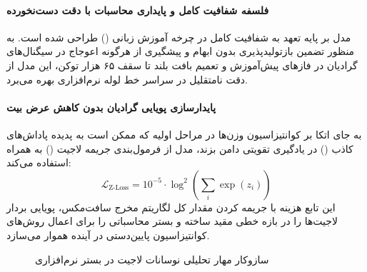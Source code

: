 \item {}

\paragraph*{فلسفه شفافیت کامل و پایداری محاسبات با دقت دست‌نخورده}
مدل  \cite{olmo2025olmo3} بر پایه تعهد به شفافیت کامل در چرخه آموزش زبانی () طراحی شده است. به منظور تضمین بازتولیدپذیری بدون ابهام و پیشگیری از هرگونه اعوجاج در سیگنال‌های گرادیان در فازهای پیش‌آموزش و تعمیم بافت بلند تا سقف ۶۵ هزار توکن، این مدل از دقت نامتقلیل \textbf{} در سراسر خط لوله نرم‌افزاری  بهره می‌برد.

\paragraph*{پایدارسازی پویایی گرادیان بدون کاهش عرض بیت}
به جای اتکا بر کوانتیزاسیون وزن‌ها در مراحل اولیه که ممکن است به پدیده پاداش‌های کاذب () در یادگیری تقویتی دامن بزند، مدل  از فرمول‌بندی جریمه لاجیت () به همراه  استفاده می‌کند:
\begin{equation}
    \mathcal{L}_{\text{Z-Loss}} = 10^{-5} \cdot \log^2 \left( \sum_{i} \exp(z_i) \right)
\end{equation}
این تابع هزینه با جریمه کردن مقدار کل لگاریتم مخرج سافت‌مکس، پویایی بردار لاجیت‌ها را در بازه خطی مقید ساخته و بستر محاسباتی را برای اعمال روش‌های کوانتیزاسیون پایین‌دستی در آینده هموار می‌سازد.

\begin{figure}[htbp]
\centering
{}
\caption{سازوکار مهار تحلیلی نوسانات لاجیت در بستر نرم‌افزاری }
\label{fig:olmo3_quant}
\end{figure}